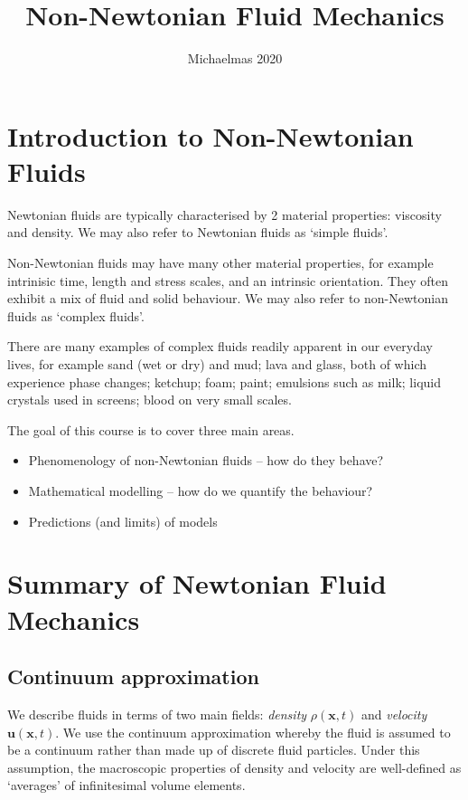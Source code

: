 \documentclass{jknotes}
\begin{document}
\title{Non-Newtonian Fluid Mechanics}
\date{Michaelmas 2020}

\maketitle
\suggestionsspiel
\tableofcontents

\section{Introduction to Non-Newtonian Fluids}
Newtonian fluids are typically characterised by 2 material properties:
viscosity and density. We may also refer to Newtonian fluids as `simple
fluids'.


Non-Newtonian fluids may have many other material properties, for example
intrinisic time, length and stress scales, and an intrinsic orientation. They
often exhibit a mix of fluid and solid behaviour. We may also refer to
non-Newtonian fluids as `complex fluids'.


There are many examples of complex fluids readily apparent in our everyday
lives, for example sand (wet or dry) and mud; lava and glass, both of which
experience phase changes; ketchup; foam; paint; emulsions such as milk; liquid
crystals used in screens; blood on very small scales.


The goal of this course is to cover three main areas.
\begin{itemize}
	\item Phenomenology of non-Newtonian fluids -- how do they behave?
	\item Mathematical modelling -- how do we quantify the behaviour?
	\item Predictions (and limits) of models
\end{itemize}

\section{Summary of Newtonian Fluid Mechanics}
\subsection{Continuum approximation}
We describe fluids in terms of two main fields: \emph{density} $\rho(\bm{x},t)$  and
\emph{velocity} $\bm{u}(\bm{x},t)$. We use the continuum approximation whereby the
fluid is assumed to be a continuum rather than made up of discrete fluid
particles. Under this assumption, the macroscopic properties of density and
velocity are well-defined as `averages' of infinitesimal volume elements. 
\end{document}
